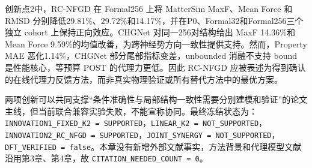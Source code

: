 创新点2中，RC-NFGD 在 Formal256 上将 Matter\allowbreak Sim MaxF、Mean Force 和 RMSD 分别降低29.81\%、29.72\%和14.17\%，并在P0、Formal\allowbreak 32和Formal256三个独立 cohort 上保持正向效应。CHGNet 对同一256对结构给出 MaxF 14.36\%和 Mean Force 9.59\%的均值改善，为跨神经势方向一致性提供支持。然而，Property MAE 恶化1.14\%，CHGNet 部分尾部指标变差，unbounded 消融不支持 bound 是性能核心，等预算 POST 的代理力更低。因此 RC-NFGD 应被表述为得到确认的在线代理力反馈方法，而非真实物理验证或所有替代方法中的最优方案。

两项创新可以共同支撑``条件准确性与局部结构一致性需要分别建模和验证''的论文主线，但当前联合兼容实验失败，不能宣称协同。最终冻结状态为：\texttt{INNOVATION1\_FIXED\_K2\ =\ SUP\allowbreak PORTED}，\texttt{LINEAR\_K2\ =\ NOT\_SUP\allowbreak PORTED}，\texttt{INNOVATION2\_RC\_NFGD\ =\ SUP\allowbreak PORTED}，\texttt{JOINT\_SYNERGY\ =\ NOT\_SUP\allowbreak PORTED}，\texttt{DFT\_VERIFIED\ =\ false}。本章没有新增外部文献事实，方法背景和代理模型文献沿用第3章、第4章，故 \texttt{CITATION\_NEEDED\_COUNT\ =\ 0}。
